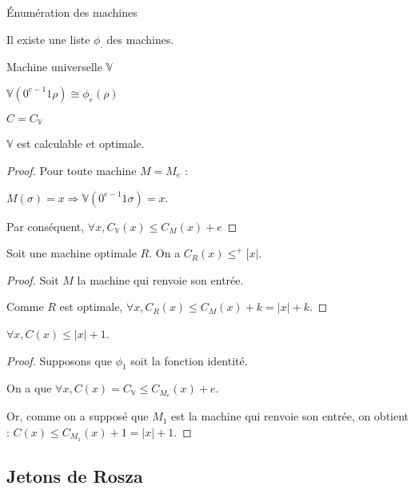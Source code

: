 \begin{definition} Énumération des machines
\par Il existe une liste $\phi_.$ des machines.
\end{definition}

\begin{definition}Machine universelle $\mathbb{V}$
\par $\mathbb{V}(0^{e-1}1\rho) \cong \phi_e(\rho)$
\par $C = C_\mathbb{V}$
\end{definition}

\begin{theorem}
$\mathbb{V}$ est calculable et optimale.
\end{theorem}

\begin{proof}
\par Pour toute machine $M = M_e$ :
\par $M(\sigma) = x \Rightarrow \mathbb{V}(0^{e-1}1\sigma) = x$.
\par Par conséquent, $\forall x, C_\mathbb{V}(x) \leqslant C_M(x) + e$
\end{proof}

\begin{theorem}
Soit une machine optimale $R$. On a $C_R(x) \leqslant^+ [x|$.
\end{theorem}

\begin{proof}
Soit $M$ la machine qui renvoie son entrée.
\par Comme $R$ est optimale, $\forall x, C_R(x) \leqslant C_M(x) + k = |x| + k$.
\end{proof}

\begin{theorem}
$\forall x, C(x) \leqslant |x| + 1$.
\end{theorem}

\begin{proof}
Supposons que $\phi_1$ soit la fonction identité.
\par On a que $\forall x, C(x) = C_\mathbb{V} \leqslant C_{M_e}(x) + e$.
\par Or, comme on a supposé que $M_1$ est la machine qui renvoie son entrée, on obtient : $C(x) \leqslant C_{M_1}(x) + 1 = |x| + 1$.
\end{proof}

	\subsection{Jetons de Rosza}
